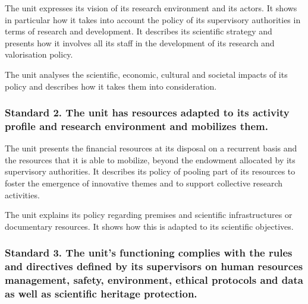 \begin{hceresinstructions}
  The unit expresses its vision of its research environment and its
  actors. It shows in particular how it takes into account the policy of
  its supervisory authorities in terms of research and development. It
  describes its scientific strategy and presents how it involves all its
  staff in the development of its research and valorisation policy.

  The unit analyses the scientific, economic, cultural and societal
  impacts of its policy and describes how it takes them into
  consideration.
\end{hceresinstructions}

\subsubsection*{Standard 2. The unit has resources adapted to its activity
profile and research environment and mobilizes them.}

\begin{hceresinstructions}
  The unit presents the financial resources at its disposal on a recurrent
  basis and the resources that it is able to mobilize, beyond the
  endowment allocated by its supervisory authorities. It describes its
  policy of pooling part of its resources to foster the emergence of
  innovative themes and to support collective research activities.

  The unit explains its policy regarding premises and scientific
  infrastructures or documentary resources. It shows how this is adapted
  to its scientific objectives.
\end{hceresinstructions}

\subsubsection*{Standard 3. The unit's functioning complies with the
rules and directives defined by its supervisors on human resources
management, safety, environment, ethical protocols and data as well as
scientific heritage protection.}

